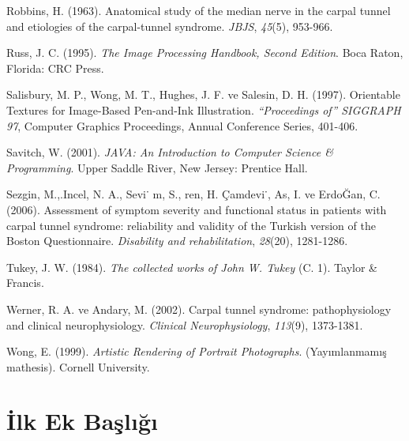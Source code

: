 \documentclass[12pt,twoside]{deuthesis}
\begin{document}
\begin{CSLReferences}{1}{0}
\leavevmode{}%
Robbins, H. (1963). Anatomical study of the median nerve in the carpal tunnel and etiologies of the carpal-tunnel syndrome. \emph{JBJS}, \emph{45}(5), 953-966.

\leavevmode{}%
Russ, J. C. (1995). \emph{{The Image Processing Handbook, Second Edition}}. Boca Raton, Florida: CRC Press.

\leavevmode{}%
Salisbury, M. P., Wong, M. T., Hughes, J. F. ve Salesin, D. H. (1997). Orientable Textures for Image-Based Pen-and-Ink Illustration. \emph{{``Proceedings of''} SIGGRAPH 97}, Computer Graphics Proceedings, Annual Conference Series, 401-406.

\leavevmode{}%
Savitch, W. (2001). \emph{JAVA: An Introduction to Computer Science \& Programming}. Upper Saddle River, New Jersey: Prentice Hall.

\leavevmode{}%
Sezgin, M.,.Incel, N. A., Sevi˙ m, S., ren, H. Çamdevi˙, As, I. ve ErdoĞan, C. (2006). Assessment of symptom severity and functional status in patients with carpal tunnel syndrome: reliability and validity of the Turkish version of the Boston Questionnaire. \emph{Disability and rehabilitation}, \emph{28}(20), 1281-1286.

\leavevmode{}%
Tukey, J. W. (1984). \emph{The collected works of John W. Tukey} (C. 1). Taylor \& Francis.

\leavevmode{}%
Werner, R. A. ve Andary, M. (2002). Carpal tunnel syndrome: pathophysiology and clinical neurophysiology. \emph{Clinical Neurophysiology}, \emph{113}(9), 1373-1381.

\leavevmode{}%
Wong, E. (1999). \emph{{Artistic Rendering of Portrait Photographs}}. (Yayımlanmamış mathesis). Cornell University.

\end{CSLReferences}
\setlength{\parindent}{-0.20in}
\setlength{\leftskip}{0.20in}
\setlength{\parskip}{8pt}

\appendix

\hypertarget{ilk-ek-baux15flux131ux11fux131}{%
\chapter{İlk Ek Başlığı}\label{ilk-ek-baux15flux131ux11fux131}}
\end{document}
